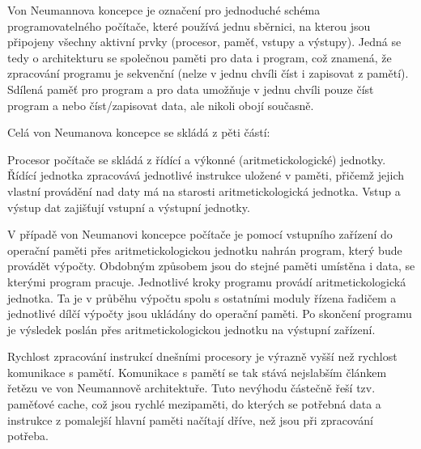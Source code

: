 Von Neumannova koncepce je označení pro jednoduché schéma programovatelného počítače, které používá jednu sběrnici, na kterou jsou připojeny všechny aktivní prvky (procesor, paměť, vstupy a výstupy). Jedná se tedy o architekturu se společnou paměti pro data i program, což znamená, že zpracování programu je sekvenční (nelze v jednu chvíli číst i zapisovat z pamětí). Sdílená paměť pro program a pro data umožňuje v jednu chvíli pouze číst program a nebo číst/zapisovat data, ale nikoli obojí současně.

Celá von Neumanova koncepce se skládá z pěti částí:


Procesor počítače se skládá z řídící a výkonné (aritmetickologické) jednotky. Řídící jednotka zpracovává jednotlivé instrukce uložené v paměti, přičemž jejich vlastní provádění nad daty má na starosti aritmetickologická jednotka. Vstup a výstup dat zajišťují vstupní a výstupní jednotky.

\vskip 4mm
\centerline{}
\vskip 4mm

V případě von Neumanovi koncepce počítače je pomocí vstupního zařízení do operační paměti přes aritmetickologickou jednotku nahrán program, který bude provádět výpočty. Obdobným způsobem jsou do stejné paměti umístěna i data, se kterými program pracuje. Jednotlivé kroky programu provádí aritmetickologická jednotka. Ta je v průběhu výpočtu spolu s ostatními moduly řízena řadičem a jednotlivé dílčí výpočty jsou ukládány do operační paměti. Po skončení programu je výsledek poslán přes aritmetickologickou jednotku na výstupní zařízení.

Rychlost zpracování instrukcí dnešními procesory je výrazně vyšší než rychlost komunikace s pamětí. Komunikace s pamětí se tak stává nejslabším článkem řetězu ve von Neumannově architektuře. Tuto nevýhodu částečně řeší tzv. paměťové cache, což jsou rychlé mezipaměti, do kterých se potřebná data a instrukce z pomalejší hlavní paměti načítají dříve, než jsou při zpracování potřeba.


